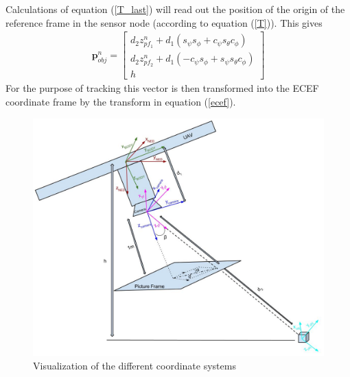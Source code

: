 Calculations of equation (\ref{T_last}) will read out the position of the origin of the reference frame in the sensor node (according to equation (\ref{T})). This gives
\begin{eqnarray}
\boldsymbol{p}_{obj}^n = \begin{bmatrix}
d_2z_{pf_1}^n + d_1(s_\psi s_\phi + c_ \psi s_\theta c_\phi)\\
d_2z_{pf_2}^n + d_1(-c_\psi s_\phi + s_\psi s_\theta c_\phi)\\
h
\end{bmatrix}
\end{eqnarray}
For the purpose of tracking this vector is then transformed into the ECEF coordinate frame by the transform in equation (\ref{ecef}).
\begin{figure}[H]
\centering
\includegraphics[width = 18cm]{fig/camera.jpg}
\caption{Visualization of the different coordinate systems}
\label{camera}
\end{figure}
